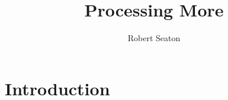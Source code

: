 \documentclass{tufte-book}
\author{Robert Seaton}
\title{Processing More}
\begin{document}
\maketitle
\frontmatter
\tableofcontents

\chapter*{Introduction}


\mainmatter

%
%
%
%

\backmatter
% 
% 

\printindex %
\end{document}
